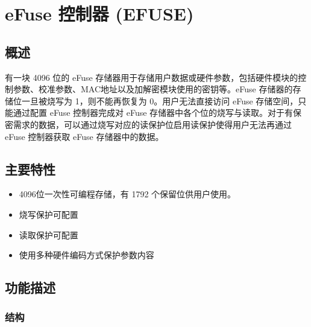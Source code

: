 \documentclass[main\_\_CN.tex]{subfiles}
\begin{document}

\ifglobal
\else
    {\let\clearpage\relax \listoftodos}
    {\let\clearpage\relax \listofdonetodos}
    \tableofcontents
\fi



\chapter{eFuse 控制器 (EFUSE)}
\label{mod:efuse}
\hypertarget{efuse}{}

\section{概述}

\chipname{} 有一块 4096 位的 eFuse 存储器用于存储用户数据或硬件参数，包括硬件模块的控制参数、校准参数、MAC地址以及加解密模块使用的密钥等。eFuse 存储器的存储位一旦被烧写为 1，则不能再恢复为 0。用户无法直接访问 eFuse 存储空间，只能通过配置 eFuse 控制器完成对 eFuse 存储器中各个位的烧写与读取。对于有保密需求的数据，可以通过烧写对应的读保护位启用读保护使得用户无法再通过 eFuse 控制器获取 eFuse 存储器中的数据。


\section{主要特性}

\begin{itemize}
    \item 4096位一次性可编程存储，有 1792 个保留位供用户使用。
    \item 烧写保护可配置
    \item 读取保护可配置
    \item 使用多种硬件编码方式保护参数内容
\end{itemize}


\section{功能描述}

\subsection{结构}
\end{document}
